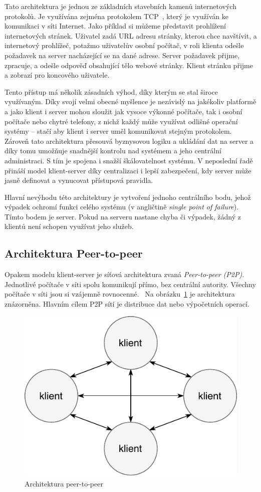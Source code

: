 Tato architektura je jednou ze základních stavebních kamenů
internetových protokolů. Je využívána zejména protokolem
\gls{TCP}~\cite{postel1981transmission}, který je využíván ke
komunikaci v síti Internet. Jako příklad si můžeme představit
prohlížení internetových stránek. Uživatel zadá \gls{URL} adresu
stránky, kterou chce navštívit, a internetový prohlížeč, potažmo uživatelův osobní počítač,
v roli klienta odešle požadavek na server nacházející se na dané adrese.
Server požadavek přijme, zpracuje, a odešle odpověď obsahující
tělo webové stránky. Klient stránku přijme a zobrazí pro koncového
uživatele.

Tento přístup má několik zásadních výhod, díky kterým se stal
široce využívaným. Díky svojí velmi obecné myšlence je nezávislý
na jakékoliv platformě a jako klient i server mohou sloužit
jak vysoce výkonné počítače, tak i osobní počítače nebo chytré telefony,
z nichž každý může využívat odlišné operační systémy –
stačí aby klient i server uměl komunikovat stejným protokolem.
Zároveň tato architektura přesouvá byznysovou logiku a
ukládání dat na server a díky tomu umožňuje
snadnější kontrolu nad systémem a jeho centrální administraci. S tím
je spojena i snažší škálovatelnost systému. V neposlední řadě
přináší model klient-server díky centralizaci i lepší zabezpečení,
kdy server může jasně definovat a vynucovat přístupová pravidla.

Hlavní nevýhodu této architektury je vytvoření jednoho centrálního bodu,
jehož výpadek ochromí funkci celého systému (v angličtině
\textit{single point of failure}). Tímto bodem je server.
Pokud na serveru nastane chyba či výpadek, žádný z klientů není schopen využívat
jeho služeb.

\subsection{Architektura Peer-to-peer}\label{sec:p2p}

Opakem modelu klient-server je síťová architektura zvaná \textit{Peer-to-peer (\gls{P2P})}.
Jednotlivé počítače v síti spolu komunikují přímo, bez centrální autority.
Všechny počítače v síti jsou si vzájemně rovnocenné.~\cite{fox2001peer}
Na obrázku~\ref{fig:peer-to-peer} je architektura znázorněna.
Hlavním cílem \gls{P2P} sítí je distribuce dat nebo výpočetních operací.

\begin{figure}[t]
    \centering
    \includegraphics[keepaspectratio=true, width=0.4\linewidth]{figures/peer-to-peer.pdf}
    \caption{Architektura peer-to-peer}
    \label{fig:peer-to-peer}
\end{figure}

